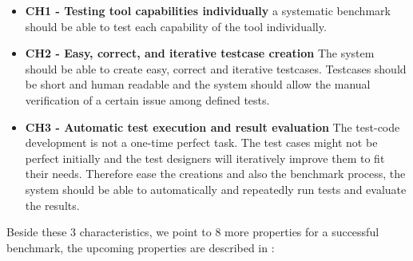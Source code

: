 \documentclass[authoryear,preprint]{sigplanconf}
\begin{document}
\begin{itemize}
	\item \textbf{CH1 - Testing tool capabilities individually} a systematic benchmark should be able to test each capability of the tool individually. 
	\item \textbf{CH2 - Easy, correct, and iterative testcase creation} The system should be able to create easy, correct and iterative testcases. Testcases should be short and human readable and the system should allow the manual verification of a certain issue among defined tests. 
	\item \textbf{CH3 - Automatic test execution and result evaluation} The test-code development is not a one-time perfect task. The test cases might not be perfect initially and the test designers will iteratively improve them to fit their needs. Therefore ease the creations and also the benchmark process, the system should be able to automatically and repeatedly run tests and evaluate the results. 
\end{itemize}

Beside these 3 characteristics, we point to 8 more properties for a successful benchmark, the upcoming properties are described in \cite{sim2003}:
\end{document}
